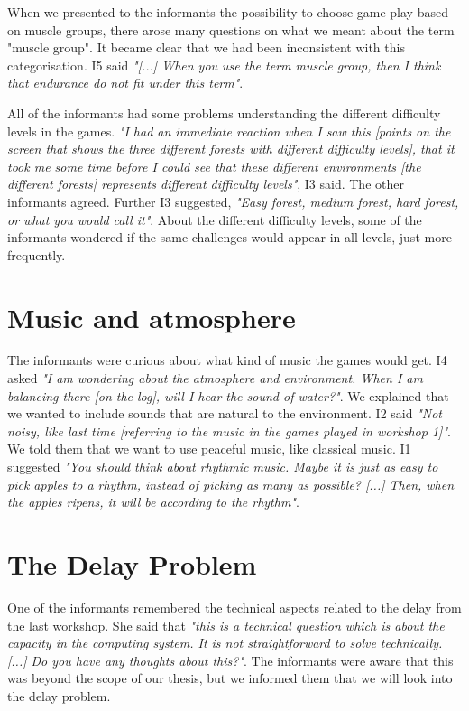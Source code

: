 When we presented to the informants the possibility to choose game play based on muscle groups, there arose many questions on what we meant about the term "muscle group". It became clear that we had been inconsistent with this categorisation. I5 said \emph{"[...] When you use the term muscle group, then I think that endurance do not fit under this term"}.   

All of the informants had some problems understanding the different difficulty levels in the games. \emph{"I had an immediate reaction when I saw this [points on the screen that shows the three different forests with different difficulty levels], that it took me some time before I could see that these different environments [the different forests] represents different difficulty levels"}, I3 said. The other informants agreed. Further I3 suggested, \emph{"Easy forest, medium forest, hard forest, or what you would call it"}. About the different difficulty levels, some of the informants wondered if the same challenges would appear in all levels, just more frequently. 

\section{Music and atmosphere}

The informants were curious about what kind of music the games would get. I4 asked \emph{"I am wondering about the atmosphere and environment. When I am balancing there [on the log], will I hear the sound of water?"}. We explained that we wanted to include sounds that are natural to the environment. I2 said \emph{"Not noisy, like last time [referring to the music in the games played in workshop 1]"}. We told them that we want to use peaceful music, like classical music. I1 suggested \emph{"You should think about rhythmic music. Maybe it is just as easy to pick apples to a rhythm, instead of picking as many as possible? [...] Then, when the apples ripens, it will be according to the rhythm"}. 

\section{The Delay Problem}

One of the informants remembered the technical aspects related to the delay from the last workshop. She said that \emph{"this is a technical question which is about the capacity in the computing system. It is not straightforward to solve technically. [...] Do you have any thoughts about this?"}. The informants were aware that this was beyond the scope of our thesis, but we informed them that we will look into the delay problem.

